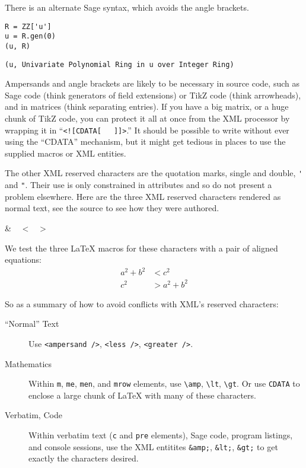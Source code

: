 \documentclass[10pt,]{article}
\theoremstyle{plain}
\theoremstyle{definition}
\theoremstyle{definition}
\theoremstyle{definition}
\theoremstyle{definition}
\theoremstyle{definition}
\theoremstyle{definition}
\numberwithin{equation}{section}
\newcommand{\lt}{<}
\newcommand{\gt}{>}
\newcommand{\amp}{&}
\begin{document}
\hypertarget{p-201}{}%
There is an alternate Sage syntax, which avoids the angle brackets.%
\begin{lstlisting}[style=sageinput]
R = ZZ['u']
u = R.gen(0)
(u, R)
\end{lstlisting}
\begin{lstlisting}[style=sageoutput]
(u, Univariate Polynomial Ring in u over Integer Ring)
\end{lstlisting}
\hypertarget{p-202}{}%
Ampersands and angle brackets are likely to be necessary in source code, such as Sage code (think generators of field extensions) or TikZ code (think arrowheads), and in matrices (think separating entries).  If you have a big matrix, or a huge chunk of TikZ code, you can protect it all at once from the XML processor by wrapping it in ``\lstinline?<![CDATA[?~~~\lstinline?]]>?.''  It should be possible to write without ever using the ``CDATA'' mechanism, but it might get tedious in places to use the supplied macros or XML entities.%
\par
\hypertarget{p-203}{}%
The other XML reserved characters are the quotation marks, single and double, \lstinline?'? and \lstinline?"?.  Their use is only constrained in attributes and so do not present a problem elsewhere.  Here are the three XML reserved characters rendered as normal text, see the source to see how they were authored.%
\par
\hypertarget{p-204}{}%
\&~~ \textless{}~~ \textgreater{}~~%
\par
\hypertarget{p-205}{}%
We test the three \LaTeX{} macros for these characters with a pair of aligned equations:%
\begin{align*}
a^2 + b^2\amp\lt c^2\\
c^2\amp\gt a^2 + b^2
\end{align*}
%
\par
\hypertarget{p-206}{}%
So as a summary of how to avoid conflicts with XML's reserved characters:\leavevmode%
\begin{description}
\item[{``Normal'' Text}]\hypertarget{li-31}{}\hypertarget{p-207}{}%
Use \lstinline?<ampersand />?, \lstinline?<less />?, \lstinline?<greater />?.%
\item[{Mathematics}]\hypertarget{reserved-characters-mathematics}{}\hypertarget{p-208}{}%
Within \lstinline?m?, \lstinline?me?, \lstinline?men?, and \lstinline?mrow? elements, use \lstinline?\amp?, \lstinline?\lt?, \lstinline?\gt?.  Or use \lstinline?CDATA? to enclose a large chunk of \LaTeX{} with many of these characters.%
\item[{Verbatim, Code}]\hypertarget{li-33}{}\hypertarget{p-209}{}%
Within verbatim text (\lstinline?c? and \lstinline?pre? elements), Sage code, program listings, and console sessions, use the XML entitites \lstinline?&amp;?, \lstinline?&lt;?, \lstinline?&gt;? to get exactly the characters desired.%
\end{description}
\end{document}
